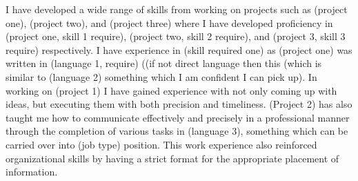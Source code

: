 I have developed a wide range of skills from working on projects such as (project one), (project two), and (project three) where I have developed proficiency in (project one, skill 1 require), (project two, skill 2 require), and (project 3, skill 3 require) respectively. I have experience in (skill required one) as (project one) was written in (language 1, require) ((if not direct language then this (which is similar to (language 2) something which I am confident I can pick up). In working on (project 1) I have gained experience with not only coming up with ideas, but executing them with both precision and timeliness. (Project 2) has also taught me how to communicate effectively and precisely in a professional manner through the completion of various tasks in (language 3), something which can be carried over into (job type) position. This work experience also reinforced organizational skills by having a strict format for the appropriate placement of information. 